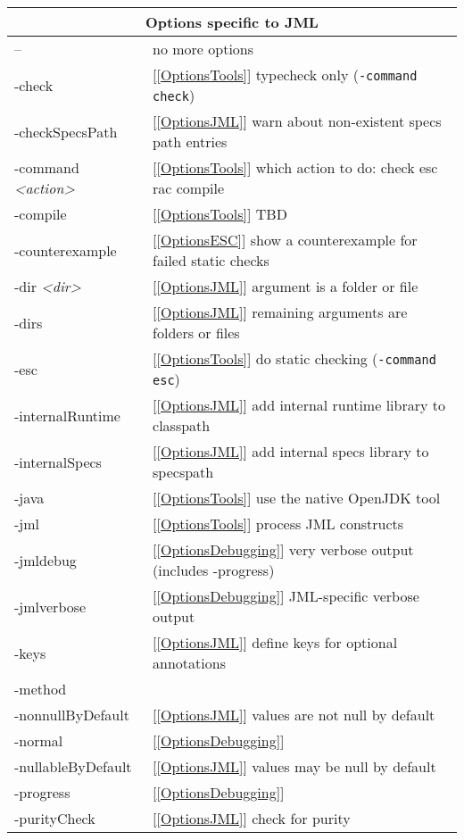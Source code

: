 \documentclass{report}%
\begin{document}
\begin{table} \small
\parbox{.5\textwidth}{
\begin{tabular}{|l|p{1.4in}|}
\hline
\multicolumn{2}{|c|}{Options specific to JML} \\
\hline
-- & no more options \\ \hline
-check & [\ref{OptionsTools}] typecheck only ({\tt -command check})\\ \hline
-checkSpecsPath & [\ref{OptionsJML}] warn about non-existent specs path entries\\ \hline
-command {\it <action>}& [\ref{OptionsTools}] which action to do: check esc rac compile\\ \hline
-compile & [\ref{OptionsTools}] TBD\\ \hline
-counterexample & [\ref{OptionsESC}] show a counterexample for failed static checks\\ \hline
-dir {\it <dir>} & [\ref{OptionsJML}] argument is a folder or file \\ \hline
-dirs & [\ref{OptionsJML}] remaining arguments are folders or files\\ \hline
-esc & [\ref{OptionsTools}] do static checking ({\tt -command esc}) \\ \hline
-internalRuntime & [\ref{OptionsJML}] add internal runtime library to classpath \\ \hline
-internalSpecs & [\ref{OptionsJML}] add internal specs library to specspath \\ \hline
-java & [\ref{OptionsTools}] use the native OpenJDK tool\\ \hline
-jml & [\ref{OptionsTools}] process JML constructs \\ \hline
-jmldebug & [\ref{OptionsDebugging}] very verbose output (includes -progress) \\ \hline
-jmlverbose & [\ref{OptionsDebugging}] JML-specific verbose output\\ \hline
-keys & [\ref{OptionsJML}] define keys for optional annotations \\ \hline
-method & \\ \hline
-nonnullByDefault & [\ref{OptionsJML}] values are not null by default \\ \hline
-normal & [\ref{OptionsDebugging}] \\ \hline
-nullableByDefault & [\ref{OptionsJML}] values may be null by default\\ \hline
-progress & [\ref{OptionsDebugging}] \\ \hline
-purityCheck & [\ref{OptionsJML}] check for purity \\ \hline

\end{tabular}}
\end{table}
\end{document}
